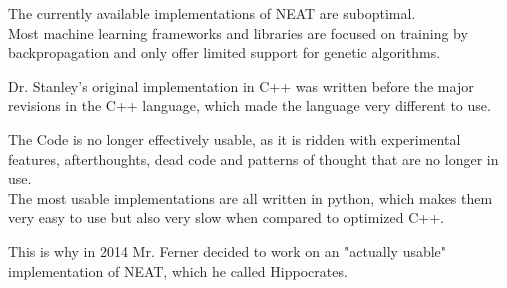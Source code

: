 The currently available implementations of NEAT are suboptimal. \\
Most machine learning frameworks and libraries are focused on training by backpropagation and only offer limited support for genetic algorithms.

Dr. Stanley's original implementation in C++ \cite{Stanley2010} was written before the major revisions in the
C++ language, which made the language very different to use. \cite{Stroustrup2013}

The Code is no longer effectively usable, as it is ridden with experimental features, afterthoughts, dead code and patterns of thought that are no longer in use. \\
The most usable implementations are all written in python, which makes them very easy to use but also very slow when compared to optimized C++.

This is why in 2014 Mr. Ferner decided to work on an "actually usable" implementation of NEAT,
which he called Hippocrates.
